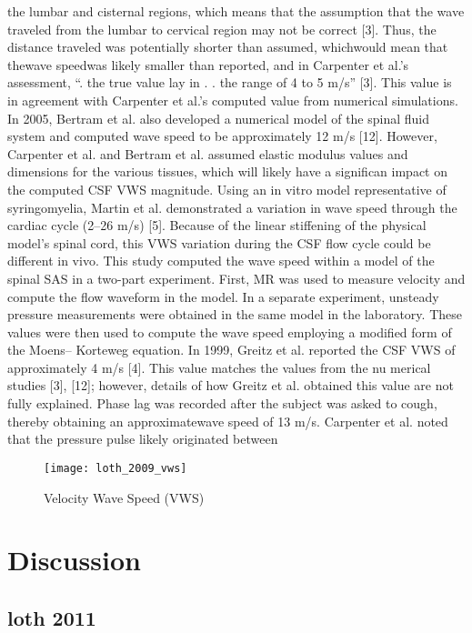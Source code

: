 \documentclass{report}
\begin{document}
the lumbar and cisternal regions, which means that the assumption
that the wave traveled from the lumbar to cervical region may not
be correct [3]. Thus, the distance traveled was potentially shorter than
assumed, whichwould mean that thewave speedwas likely smaller than
reported, and in Carpenter et al.’s assessment, “.
the true value lay in
. .
the range of 4 to 5 m/s” [3]. This value is in agreement with Carpenter
et al.’s computed value from numerical simulations. In 2005, Bertram
et al. also developed a numerical model of the spinal fluid system
and computed wave speed to be approximately 12 m/s [12]. However,
Carpenter et al. and Bertram et al. assumed elastic modulus values and
dimensions for the various tissues, which will likely have a significan
impact on the computed CSF VWS magnitude.
Using an in vitro model representative of syringomyelia, Martin
et al. demonstrated a variation in wave speed through the cardiac cycle
(2–26 m/s) [5]. Because of the linear stiffening of the physical model’s
spinal cord, this VWS variation during the CSF flow cycle could be
different in vivo. This study computed the wave speed within a model
of the spinal SAS in a two-part experiment. First, MR was used to
measure velocity and compute the flow waveform in the model. In a
separate experiment, unsteady pressure measurements were obtained
in the same model in the laboratory. These values were then used to
compute the wave speed employing a modified form of the Moens–
Korteweg equation. In 1999, Greitz et al. reported the CSF VWS of
approximately 4 m/s [4]. This value matches the values from the nu
merical
studies [3], [12]; however, details of how Greitz et al. obtained
this value are not fully explained.
Phase lag was recorded after the subject was
asked to cough, thereby obtaining an approximatewave speed of 13 m/s.
Carpenter et al. noted that the pressure pulse likely originated between

\begin{figure}[!h]
\centering
\caption{\label{anatomy} Velocity Wave Speed (VWS)}
    \texttt{[image: loth\_2009\_vws]}
\end{figure}

\section{Discussion}

\subsection{loth 2011}
\end{document}
